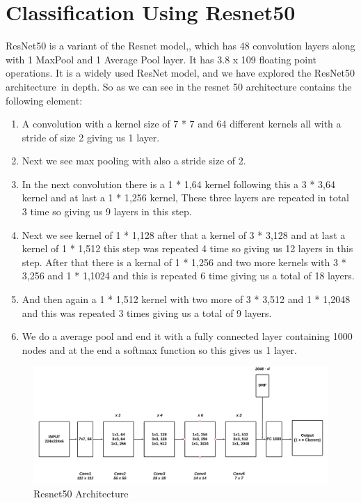 \section{Classification Using Resnet50}
ResNet50 is a variant of the Resnet model,, which has 48 convolution layers along with 1 MaxPool and 1 Average Pool layer. It has 3.8 x 109 floating point operations. It is a widely used ResNet model, and we have explored the ResNet50 architecture in depth. So as we can see in the resnet 50 architecture contains the following element:
\begin{enumerate}
    \item A convolution with a kernel size of 7 * 7 and 64 different kernels all with a stride of size 2 giving us 1 layer.
    \item Next we see max pooling with also a stride size of 2.
    \item In the next convolution there is a 1 * 1,64 kernel following this a 3 * 3,64 kernel and at last a 1 * 1,256 kernel, These three layers are repeated in total 3 time so giving us 9 layers in this step.
    \item Next we see kernel of 1 * 1,128 after that a kernel of 3 * 3,128 and at last a kernel of 1 * 1,512 this step was repeated 4 time so giving us 12 layers in this step.
    After that there is a kernal of 1 * 1,256 and two more kernels with 3 * 3,256 and 1 * 1,1024 and this is repeated 6 time giving us a total of 18 layers.
    \item And then again a 1 * 1,512 kernel with two more of 3 * 3,512 and 1 * 1,2048 and this was repeated 3 times giving us a total of 9 layers.
    \item We do a average pool and end it with a fully connected layer containing 1000 nodes and at the end a softmax function so this gives us 1 layer.
\end{enumerate}
\begin{figure}[H]
    \centering
    \includegraphics[scale=0.5]{40_Chapter_4/resnet50.png}
    \caption{Resnet50 Architecture}
    \label{Resnet50 Architecture}
\end{figure}
